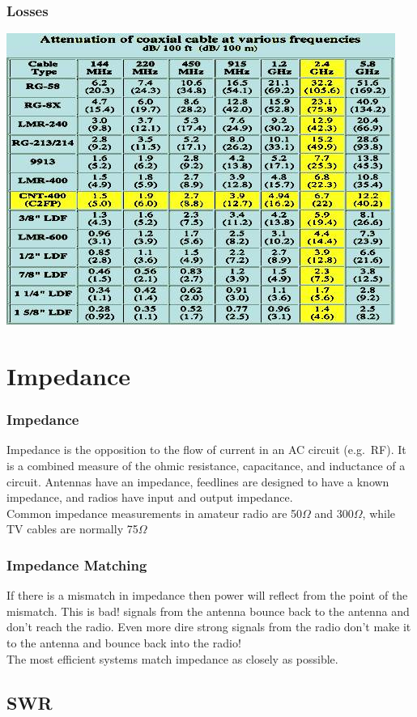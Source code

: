 \documentclass[10pt]{beamer}
\begin{document}
\begin{frame}
\frametitle{Losses}
\includegraphics[height=.9\textheight]{coaxatten.jpg}
\end{frame}

\section{Impedance}
\begin{frame}
\frametitle{Impedance}
Impedance is the opposition to the flow of current in an AC circuit (e.g.\ RF). It is a combined measure of the ohmic resistance, capacitance, and inductance of a circuit. Antennas have an impedance, feedlines are designed to have a known impedance, and radios have input and output impedance.\\
Common impedance measurements in amateur radio are 50$\Omega$ and 300$\Omega$, while TV cables are normally 75$\Omega$ 
\end{frame}

\begin{frame}
\frametitle{Impedance Matching}
If there is a mismatch in impedance then power will reflect from the point of the mismatch. This is bad! signals from the antenna bounce back to the antenna and don't reach the radio. Even more dire strong signals from the radio don't make it to the antenna and bounce back into the radio!\\
The most efficient systems match impedance as closely as possible.
\end{frame}

\subsection{SWR}
\end{document}

